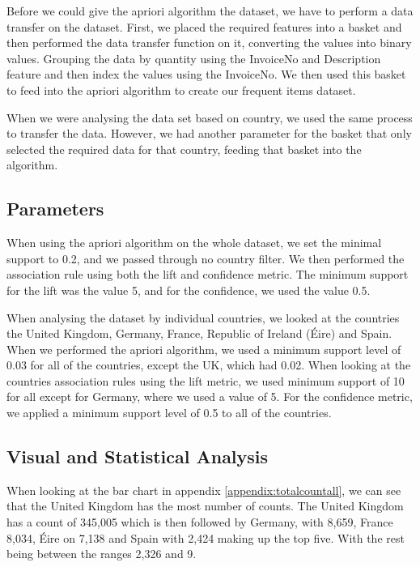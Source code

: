 \documentclass[a4paper,10pt]{article}
\begin{document}
Before we could give the apriori algorithm the dataset, we have to perform a data transfer on the dataset. First, we placed the required features into a basket and then performed the data transfer function on it, converting the values into binary values. Grouping the data by quantity using the InvoiceNo and Description feature and then index the values using the InvoiceNo. We then used this basket to feed into the apriori algorithm to create our frequent items dataset.

When we were analysing the data set based on country, we used the same process to transfer the data. However, we had another parameter for the basket that only selected the required data for that country, feeding that basket into the algorithm.


\subsection{Parameters}

When using the apriori algorithm on the whole dataset, we set the minimal support to 0.2, and we passed through no country filter. We then performed the association rule using both the lift and confidence metric. The minimum support for the lift was the value 5, and for the confidence, we used the value 0.5.

When analysing the dataset by individual countries, we looked at the countries the United Kingdom, Germany, France, Republic of Ireland (Éire) and Spain. When we performed the apriori algorithm, we used a minimum support level of 0.03 for all of the countries, except the UK, which had 0.02. When looking at the countries association rules using the lift metric, we used minimum support of 10 for all except for Germany, where we used a value of 5. For the confidence metric, we applied a minimum support level of 0.5 to all of the countries.

\subsection{Visual and Statistical Analysis}

When looking at the bar chart in appendix \ref{appendix:totalcountall}, we can see that the United Kingdom has the most number of counts. The United Kingdom has a count of 345,005 which is then followed by Germany, with 8,659, France 8,034, Éire on 7,138 and Spain with 2,424 making up the top five. With the rest being between the ranges 2,326 and 9.
\end{document}
